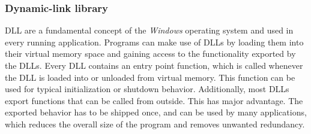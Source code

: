 \subsubsection{Dynamic-link library}
\gls{DLL} are a fundamental concept of the \emph{Windows} operating system and used in every running application. Programs can make use of \glspl{DLL} by loading them into their virtual memory space and gaining access to the functionality exported by the \glspl{DLL}. Every \gls{DLL} contains an entry point function, which is called whenever the \gls{DLL} is loaded into or unloaded from virtual memory. This function can be used for typical initialization or shutdown behavior. Additionally, most \glspl{DLL} export functions that can be called from outside. This has major advantage. The exported behavior has to be shipped once, and can be used by many applications, which reduces the overall size of the program and removes unwanted redundancy.